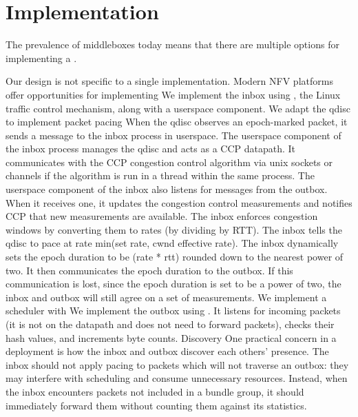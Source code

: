 \section{Implementation}\label{s:impl}

The prevalence of middleboxes today means that there are multiple options for implementing a \name.


\begin{outline}
\1 Our design is not specific to a single implementation.
    \2 Modern NFV platforms~\cite{bess, mos, netbricks} offer opportunities for implementing \name
    \2 We implement the inbox using , the Linux traffic control mechanism, along with a userspace component. We adapt the  qdisc to implement packet pacing
        \3 When the qdisc observes an epoch-marked packet, it sends a message to the inbox process in userspace.
        \3 The userspace component of the inbox process manages the qdisc and acts as a CCP datapath. It communicates with the CCP congestion control algorithm via unix sockets or channels if the algorithm is run in a thread within the same process.
        \3 The userspace component of the inbox also listens for messages from the outbox. When it receives one, it updates the congestion control measurements and notifies CCP that new measurements are available.
        \3 The inbox enforces congestion windows by converting them to rates (by dividing by RTT). The inbox tells the qdisc to pace at rate min(set rate, cwnd effective rate).
        \3 The inbox dynamically sets the epoch duration to be (rate * rtt) rounded down to the nearest power of two. It then communicates the epoch duration to the outbox.
            \4 If this communication is lost, since the epoch duration is set to be a power of two, the inbox and outbox will still agree on a set of measurements.
    \2 We implement a scheduler with 
    \2 We implement the outbox using .
        \3 It listens for incoming packets (it is not on the datapath and does not need to forward packets), checks their hash values, and increments byte counts.
\1 Discovery 
    \2 One practical concern in a \name deployment is how the inbox and outbox discover each others' presence.
    \2 The inbox should not apply pacing to packets which will not traverse an outbox: they may interfere with scheduling and consume unnecessary resources.
        \3 Instead, when the inbox encounters packets not included in a bundle group, it should immediately forward them without counting them against its statistics.

\end{outline}
